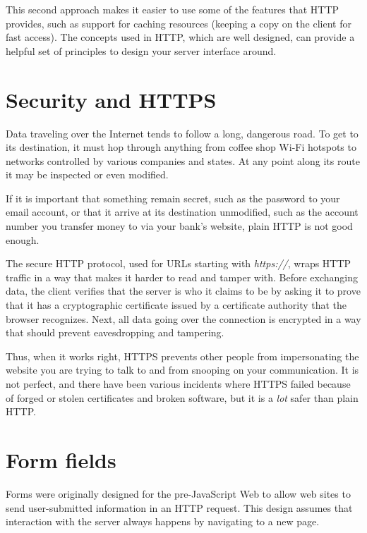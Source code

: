 This second approach makes it easier to use some of the features that HTTP provides, such as support for caching resources (keeping a copy on the client for fast access). The concepts used in HTTP, which are well designed, can provide a helpful set of principles to design your server interface around.

\section{Security and HTTPS}

Data traveling over the Internet tends to follow a long, dangerous road. To get to its destination, it must hop through anything from coffee shop Wi-Fi hotspots to networks controlled by various companies and states. At any point along its route it may be inspected or even modified.

If it is important that something remain secret, such as the password to your email account, or that it arrive at its destination unmodified, such as the account number you transfer money to via your bank's website, plain HTTP is not good enough.

The secure HTTP protocol, used for URLs starting with \emph{https://}, wraps HTTP traffic in a way that makes it harder to read and tamper with. Before exchanging data, the client verifies that the server is who it claims to be by asking it to prove that it has a cryptographic certificate issued by a certificate authority that the browser recognizes. Next, all data going over the connection is encrypted in a way that should prevent eavesdropping and tampering.

Thus, when it works right, HTTPS prevents other people from impersonating the website you are trying to talk to and from snooping on your communication. It is not perfect, and there have been various incidents where HTTPS failed because of forged or stolen certificates and broken software, but it is a \emph{lot} safer than plain HTTP.

\label{http.forms}\section{Form fields}

Forms were originally designed for the pre-JavaScript Web to allow web sites to send user-submitted information in an HTTP request. This design assumes that interaction with the server always happens by navigating to a new page.

